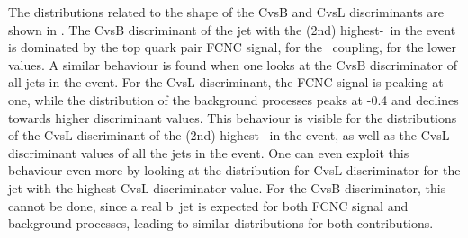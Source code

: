  The distributions related to the shape of the CvsB and CvsL discriminants are shown in . The CvsB discriminant of the jet with the (2nd) highest-\pt\ in the event is dominated by the top quark pair FCNC signal, for the \kZct\ coupling, for the lower values. A similar behaviour is found when one looks at the CvsB discriminator of all jets in the event. For the CvsL discriminant, the FCNC signal is peaking at one, while the  distribution of the background processes peaks at -0.4 and declines towards higher discriminant values. This behaviour is visible for the distributions of the CvsL discriminant of the (2nd) highest-\pt\ in the event, as well as the CvsL discriminant values of all the jets in the event. One can even exploit this behaviour even more by looking at the distribution for  CvsL discriminator for the jet with the highest CvsL discriminator value. For the CvsB discriminator, this cannot be done, since a real b~jet is expected for both FCNC signal and background processes, leading to similar distributions for both contributions. 
